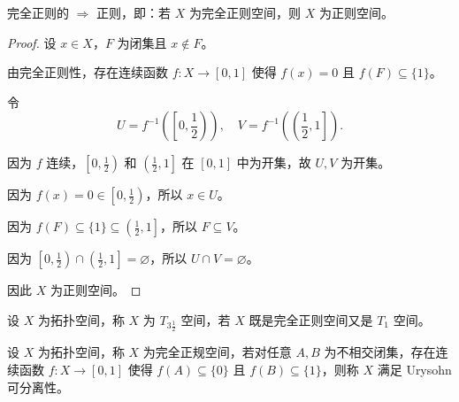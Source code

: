 \documentclass[lang=cn,a4paper,newtx,figureplace=section,tableplace=section]{elegantbook}
\begin{document}
\begin{proposition}\label{prop:completely-regular-implies-regular}
完全正则的 $\Rightarrow$ 正则，即：若 $X$ 为完全正则空间，则 $X$ 为正则空间。
\end{proposition}
\begin{proof}
设 $x \in X$，$F$ 为闭集且 $x \notin F$。

由完全正则性，存在连续函数 $f: X \to [0,1]$ 使得 $f(x) = 0$ 且 $f(F) \subseteq \{1\}$。

令
\begin{equation}
U = f^{-1}\left(\left[0, \frac{1}{2}\right)\right), \quad V = f^{-1}\left(\left(\frac{1}{2}, 1\right]\right).
\end{equation}

因为 $f$ 连续，$\left[0, \frac{1}{2}\right)$ 和 $\left(\frac{1}{2}, 1\right]$ 在 $[0,1]$ 中为开集，故 $U, V$ 为开集。

因为 $f(x) = 0 \in \left[0, \frac{1}{2}\right)$，所以 $x \in U$。

因为 $f(F) \subseteq \{1\} \subseteq \left(\frac{1}{2}, 1\right]$，所以 $F \subseteq V$。

因为 $\left[0, \frac{1}{2}\right) \cap \left(\frac{1}{2}, 1\right] = \varnothing$，所以 $U \cap V = \varnothing$。

因此 $X$ 为正则空间。
\end{proof}

\begin{definition}[$T_{3\frac{1}{2}}$ 空间]\label{def:T3.5-space}
设 $X$ 为拓扑空间，称 $X$ 为 $T_{3\frac{1}{2}}$ 空间，若 $X$ 既是完全正则空间又是 $T_1$ 空间。
\end{definition}

\begin{definition}
设 $X$ 为拓扑空间，称 $X$ 为完全正规空间，若对任意 $A, B$ 为不相交闭集，存在连续函数 $f: X \to [0,1]$ 使得 $f(A) \subseteq \{0\}$ 且 $f(B) \subseteq \{1\}$，则称 $X$ 满足 Urysohn 可分离性。
\end{definition}
\end{document}
